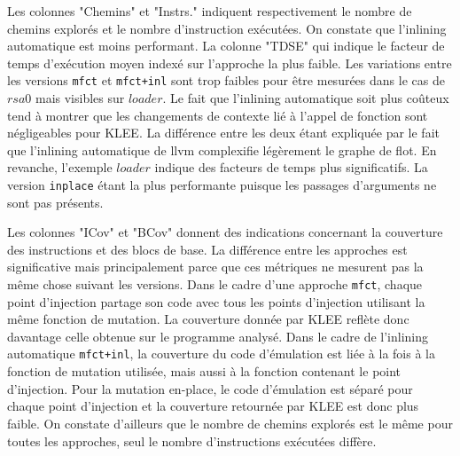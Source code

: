             Les colonnes "Chemins" et "Instrs." indiquent respectivement le nombre de chemins explorés et le nombre d'instruction exécutées. On constate que l'inlining automatique est moins performant.
            La colonne "TDSE" qui indique le facteur de temps d'exécution moyen indexé sur l'approche la plus faible. Les variations entre les versions \texttt{mfct} et \texttt{mfct+inl} sont trop faibles pour être mesurées dans le cas de $rsa0$ mais visibles sur $loader$. 
            Le fait que l'inlining automatique soit plus coûteux tend à montrer que les changements de contexte lié à l'appel de fonction sont négligeables pour KLEE. La différence entre les deux étant expliquée par le fait que l'inlining automatique de \gls{llvm} complexifie légèrement le graphe de flot.
            En revanche, l'exemple $loader$ indique des facteurs de temps plus significatifs. La version \texttt{inplace} étant la plus performante puisque les passages d'arguments ne sont pas présents.
            
            Les colonnes "ICov" et "BCov" donnent des indications concernant la couverture des instructions et des blocs de base. La différence entre les approches est significative mais principalement parce que ces métriques ne mesurent pas la même chose suivant les versions.
            Dans le cadre d'une approche \texttt{mfct}, chaque point d'injection partage son code avec tous les points d'injection utilisant la même fonction de mutation. La couverture donnée par KLEE reflète donc davantage celle obtenue sur le programme analysé.
            Dans le cadre de l'inlining automatique \texttt{mfct+inl}, la couverture du code d'émulation est liée à la fois à la fonction de mutation utilisée, mais aussi à la fonction contenant le point d'injection.
            Pour la mutation en-place, le code d'émulation est séparé pour chaque point d'injection et la couverture retournée par KLEE est donc plus faible.
            On constate d'ailleurs que le nombre de chemins explorés est le même pour toutes les approches, seul le nombre d'instructions exécutées diffère.
            
